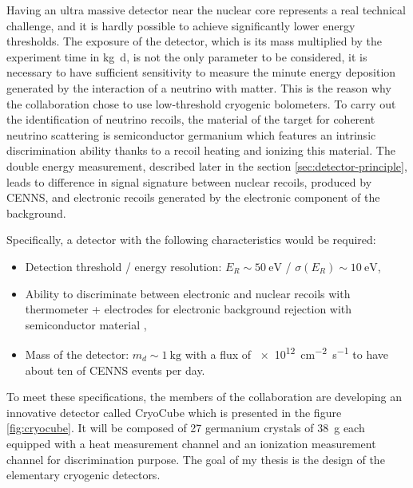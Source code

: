 Having an ultra massive detector near the nuclear core represents a real technical challenge, and it is hardly possible to achieve significantly lower energy thresholds.
The exposure of the detector, which is its mass multiplied by the experiment time in \si{\kg \day}, is not the only parameter to be considered, it is necessary to have sufficient sensitivity to measure the minute energy deposition generated by the interaction of a neutrino with matter. This is the reason why the \Ricochet{} collaboration chose to use low-threshold cryogenic bolometers.
To carry out the identification of neutrino recoils, the material of the target for coherent neutrino scattering is semiconductor germanium which features an intrinsic discrimination ability thanks to a recoil heating and ionizing this material. The double energy measurement, described later in the section \ref{sec:detector-principle}, leads to difference in signal signature between nuclear recoils, produced by CENNS, and electronic recoils generated by the electronic component of the background.


Specifically, a detector with the following characteristics would be required:
\begin{itemize}
	\item Detection threshold / energy resolution: $E_R \sim \SI{50}{\eV}$ / $\sigma(E_R) \sim \SI{10}{\eV}$,
	\item Ability to discriminate between electronic and nuclear recoils with thermometer + electrodes for electronic background rejection with semiconductor material ,
	\item Mass of the detector: $m_d \sim \SI{1}{\kg}$ with a flux of \SI{e12}{\cm^{-2} \s^{-1}} to have about ten of CENNS events per day.
\end{itemize}

To meet these specifications, the members of the \Ricochet{} collaboration are developing an innovative detector called CryoCube which is presented in the figure \ref{fig:cryocube}. It will be composed of 27 germanium crystals of \SI{38}{\g} each equipped with a heat measurement channel and an ionization measurement channel for discrimination purpose. The goal of my thesis is the design of the elementary cryogenic detectors.

